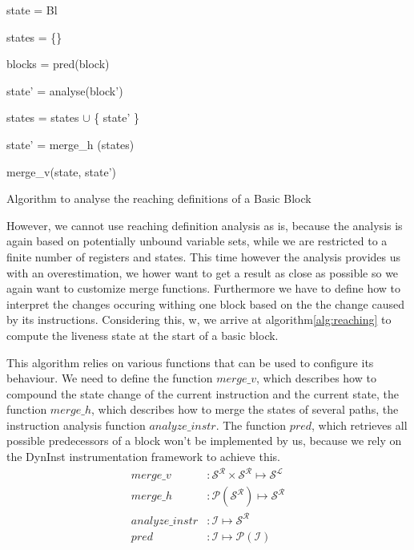{\centering \begin{algorithm}[H]
	\SetAlgoLined
	{
 	state = Bl
 	

	states = \{\}
	
	blocks = pred(block)
	
	 {
	
 		state' = analyse(block')
 		
		states = states $\cup$ \{ state' \}
	}

	state' = merge\_h (states)

	\Return merge\_v(state, state')

	}
\caption{Algorithm to analyse the reaching definitions of a Basic Block}
\label{alg:reaching}
\end{algorithm}
}


However, we cannot use reaching definition analysis as is, because the analysis is again based on potentially unbound variable sets, while we are restricted to a finite number of registers and states. This time however the analysis provides us with an overestimation, we hower want to get a result as close as possible so we again want to customize merge functions. Furthermore we have to define how to interpret the changes occuring withing one block based on the the change caused by its instructions. Considering this, w, we arrive at algorithm\ref{alg:reaching} to compute the liveness state at the start of a basic block.

This algorithm relies on various functions that can be used to configure its behaviour. We need to define the function $merge\_v$, which describes how to compound the state change of the current instruction and the current state, the function $merge\_h$, which describes how to merge the states of several paths, the instruction analysis function $analyze\_instr$. The function $pred$, which retrieves all possible predecessors of a block won't be implemented by us, because we rely on the DynInst instrumentation framework to achieve this.
\begin{subequations}
\label{eq:livenesscustom}
\begin{align}
merge\_v &: \mathcal{S}^\mathcal{R} \times \mathcal{S}^\mathcal{R} \mapsto \mathcal{S}^\mathcal{L}\\
merge\_h &: \mathcal{P}(\mathcal{S}^\mathcal{R}) \mapsto \mathcal{S}^\mathcal{R}\\
analyze\_instr &: \mathcal {I} \mapsto \mathcal{S}^\mathcal{R} \\
pred &: \mathcal{I} \mapsto \mathcal{P}(\mathcal{I})
\end{align}
\end{subequations}

